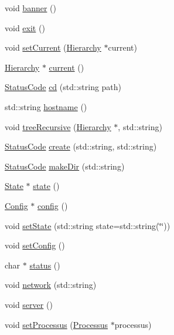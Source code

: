 \begin{DoxyCompactItemize}
void \hyperlink{classApplication_af168aa3579262d65adc0bd4531361a53}{banner} ()
\item 
void \hyperlink{classApplication_a3c8a98d6c10a5b054800488df16cdbcb}{exit} ()
\item 
void \hyperlink{classApplication_a0f0a9e376d9f1716e01e86c94ae3499f}{setCurrent} (\hyperlink{classHierarchy}{Hierarchy} $\ast$current)
\item 
\hyperlink{classHierarchy}{Hierarchy} $\ast$ \hyperlink{classApplication_af25c880ff1e95d863ed058396754a76e}{current} ()
\item 
\hyperlink{classStatusCode}{StatusCode} \hyperlink{classApplication_a29aa0687ea27762ce36ab4195bf5d77f}{cd} (std::string path)
\item 
std::string \hyperlink{classApplication_a095248805e26b553466b7fafc6517d8f}{hostname} ()
\item 
void \hyperlink{classApplication_ab4a53c51303b155b738970bec9a6ce89}{treeRecursive} (\hyperlink{classHierarchy}{Hierarchy} $\ast$, std::string)
\item 
\hyperlink{classStatusCode}{StatusCode} \hyperlink{classApplication_a552c6df459660f2d80e6d0ac6ce8279b}{create} (std::string, std::string)
\item 
\hyperlink{classStatusCode}{StatusCode} \hyperlink{classApplication_accaba6b75f26c92e7604df43c853390b}{makeDir} (std::string)
\item 
\hyperlink{classState}{State} $\ast$ \hyperlink{classApplication_adfc9b92559f61c92224abf03f51cef47}{state} ()
\item 
\hyperlink{classConfig}{Config} $\ast$ \hyperlink{classApplication_ae79819f7743d6f402fce87665c1dc9a6}{config} ()
\item 
void \hyperlink{classApplication_a4a86c9bbf7851753c7b2bc03211092fb}{setState} (std::string state=std::string(\char`\"{}\char`\"{}))
\item 
void \hyperlink{classApplication_a46614964f765fd5374b216582b599bcb}{setConfig} ()
\item 
char $\ast$ \hyperlink{classApplication_ad429c4d2322f706e3564c1ee05d38ff1}{status} ()
\item 
void \hyperlink{classApplication_ab21cc0c86ca4e63d1fbd348d709dcddc}{network} (std::string)
\item 
void \hyperlink{classApplication_a1712ebe326b3d1855b839c59f52633d8}{server} ()
\item 
void \hyperlink{classApplication_a8ed8a66653bb6e665e05a735519c5d5b}{setProcessus} (\hyperlink{classProcessus}{Processus} $\ast$processus)

\end{DoxyCompactItemize}
